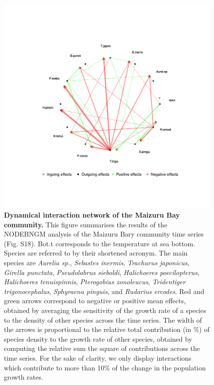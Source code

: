 \documentclass[11pt, oneside]{article}
\begin{document}
\newpage
\begin{figure}[H]
\begin{center}
\includegraphics[width=\linewidth,page=8]{figure_8.png}
\caption{
\textbf{Dynamical interaction network of the Maizuru Bay community.}
    This figure summarises the results of the NODEBNGM analysis of the Maizuru Bary community time series (Fig. S18). 
    Bot.t corresponds to the temperature at sea bottom. Species are referred to by their shortened acronym.
    The main species are \textit{Aurelia sp.}, \textit{Sebastes inermis}, \textit{Trachurus japonicus}, \textit{Girella punctata}, \textit{Pseudolabrus sieboldi}, \textit{Halichoeres poecilopterus}, \textit{Halichoeres tenuispinnis}, \textit{Pterogobius zonoleucus}, \textit{Tridentiger trigonocephalus}, \textit{Sphyraena pinguis}, and \textit{Rudarius ercodes}.
    Red and green arrows correspond to negative or positive mean effects, obtained by averaging the sensitivity of the growth rate of a species to the density of other species across the time series. 
    The width of the arrows is proportional to the relative total contribution (in \%) of species density to the growth rate of other species, obtained by computing the relative sum the square of contributions across the time series.
    For the sake of clarity, we only display interactions which contribute to more than 10\% of the change in the population growth rates.
}
\end{center}
\end{figure}
\newpage
\end{document}
